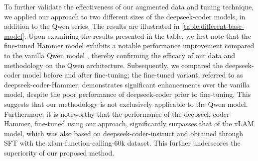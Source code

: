 \documentclass{article}
\begin{document}
To further validate the effectiveness of our augmented data and tuning technique, we applied our approach to two different sizes of the deepseek-coder models, in addition to the Qwen series. The results are illustrated in \autoref{table:different-base-model}. Upon examining the results presented in the table, we first note that the fine-tuned Hammer model exhibits a notable performance improvement compared to the vanilla Qwen model \citep{bai2023qwen, yang2024qwen2}, thereby confirming the efficacy of our data and methodology on the Qwen architecture. Subsequently, we compared the deepseek-coder model \citep{guo2024deepseek} before and after fine-tuning; the fine-tuned variant, referred to as deepseek-coder-Hammer, demonstrates significant enhancements over the vanilla model, despite the poor performance of deepseek-coder prior to fine-tuning. This suggests that our methodology is not exclusively applicable to the Qwen model. Furthermore, it is noteworthy that the performance of the deepseek-coder-Hammer, fine-tuned using our approach, significantly surpasses that of the xLAM model, which was also based on deepseek-coder-instruct and obtained through SFT with the xlam-function-calling-60k dataset. This further underscores the superiority of our proposed method.
\end{document}
